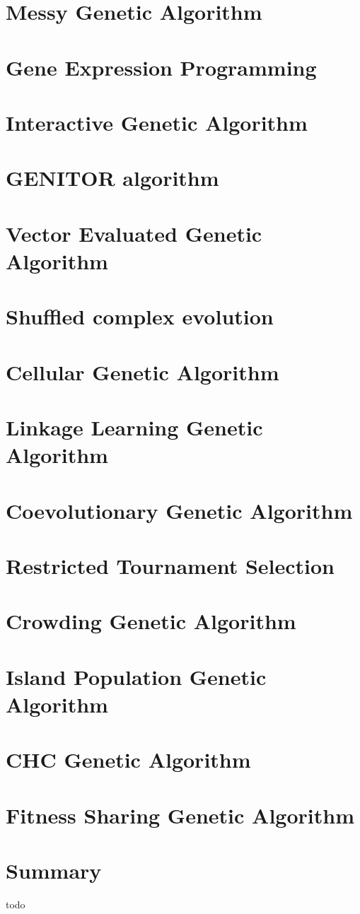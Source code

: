 \section{Messy Genetic Algorithm}
\section{Gene Expression Programming}
\section{Interactive Genetic Algorithm}
\section{GENITOR algorithm}
\section{Vector Evaluated Genetic Algorithm}
\section{Shuffled complex evolution}
\section{Cellular Genetic Algorithm}
\section{Linkage Learning Genetic Algorithm}
\section{Coevolutionary Genetic Algorithm}
\section{Restricted Tournament Selection}

\section{Crowding Genetic Algorithm}
\section{Island Population Genetic Algorithm}
\section{CHC Genetic Algorithm}
\section{Fitness Sharing Genetic Algorithm}

\section{Summary}
todo
